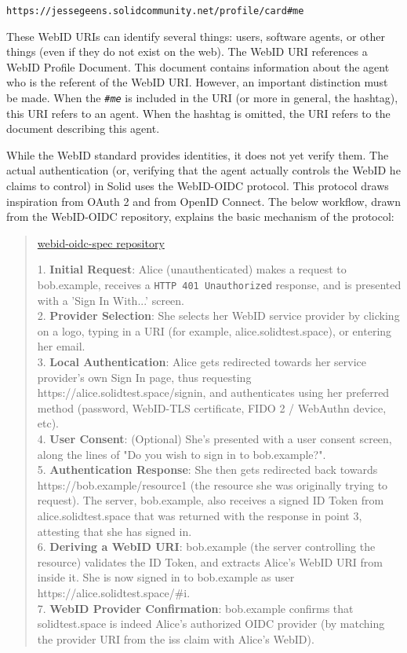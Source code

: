 \begin{center}
   \texttt{https://jessegeens.solidcommunity.net/profile/card\#me}\\
\end{center}

\noindent These WebID URIs can identify several things: users, software agents, or other things (even if they do not exist on the web). The WebID URI references a WebID Profile Document. This document contains information about the agent who is the referent of the WebID URI. However, an important distinction must be made. When the \textit{\texttt{\#me}} is included in the URI (or more in general, the hashtag), this URI refers to an agent. When the hashtag is omitted, the URI refers to the document describing this agent.

While the WebID standard provides identities, it does not yet verify them. The actual authentication (or, verifying that the agent actually controls the WebID he claims to control) in Solid uses the WebID-OIDC protocol. This protocol draws inspiration from OAuth 2 and from OpenID Connect. The below workflow, drawn from the WebID-OIDC repository, explains the basic mechanism of the protocol:

\begin{quote}{\href{https://github.com/solid/webid-oidc-spec}{webid-oidc-spec repository}}

    1. \textbf{Initial Request}: Alice (unauthenticated) makes a request to bob.example, receives a \texttt{HTTP 401 Unauthorized} response, and is presented with a 'Sign In With...' screen.\\
    2. \textbf{Provider Selection}: She selects her WebID service provider by clicking on a logo, typing in a URI (for example, alice.solidtest.space), or entering her email.\\
    3. \textbf{Local Authentication}: Alice gets redirected towards her service provider's own Sign In page, thus requesting https://alice.solidtest.space/signin, and authenticates using her preferred method (password, WebID-TLS certificate, FIDO 2 / WebAuthn device, etc).\\
    4. \textbf{User Consent}: (Optional) She's presented with a user consent screen, along the lines of "Do you wish to sign in to bob.example?".\\
    5. \textbf{Authentication Response}: She then gets redirected back towards https://bob.example/resource1 (the resource she was originally trying to request). The server, bob.example, also receives a signed ID Token from alice.solidtest.space that was returned with the response in point 3, attesting that she has signed in.\\
    6. \textbf{Deriving a WebID URI}: bob.example (the server controlling the resource) validates the ID Token, and extracts Alice's WebID URI from inside it. She is now signed in to bob.example as user https://alice.solidtest.space/\#i.\\
    7. \textbf{WebID Provider Confirmation}: bob.example confirms that solidtest.space is indeed Alice's authorized OIDC provider (by matching the provider URI from the iss claim with Alice's WebID).

\end{quote}

